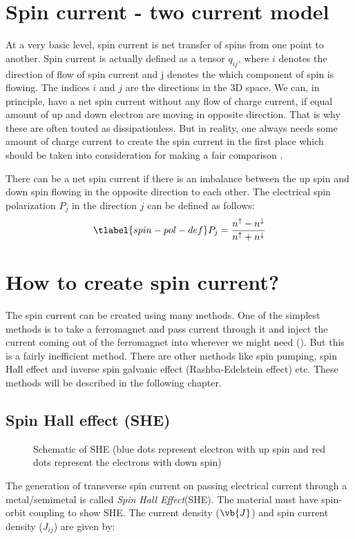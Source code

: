 
\section{Spin current - two current model}
At a very basic level, spin current is net transfer of spins from one point to another. 
Spin current is actually defined as a tensor $q_{ij}$, where $i$ denotes the direction of 
flow of spin current and j denotes the which component of spin is flowing. The indices 
$i$ and $j$ are the directions in the 3D space. We can, in principle, have a net spin current
without any flow of charge current, if equal amount of up and down electron are moving in 
opposite direction. That is why these are often touted as dissipationless. But in reality, 
one always needs some amount of charge current to create the spin current in the first place 
which should be taken into consideration for making a fair comparison \cite{spintronic-sarma}.

There can be a net spin current if there is an imbalance between the up spin and down spin 
flowing in the opposite direction to each other. The electrical spin polarization
$P_j$ in the direction $j$  can be defined as follows:
\begin{equation}
    \centering
    \tlabel{spin-pol-def}
    P_j=\frac{n^{\uparrow}-n^{\downarrow}}{n^{\uparrow}+n^{\downarrow}}
\end{equation}

\section{How to create spin current?}

The spin current can be created using many methods. One of the simplest methods is to take 
a ferromagnet and pass current through it and inject the current coming out of the 
ferromagnet into wherever we might need (). But this is a fairly inefficient method. 
There are other methods like spin pumping, spin Hall effect and inverse spin galvanic 
effect (Rashba-Edelstein effect) etc. These methods will be described in the following chapter.

\subsection{Spin Hall effect (SHE)}

\begin{figure}
    \caption{Schematic of SHE (blue dots represent electron with up spin and
    red dots represent the electrons with down spin)}
\end{figure}
The generation of transverse spin current on passing electrical current through a metal/semimetal is called
\textit{Spin Hall Effect}(SHE). The material must have spin-orbit coupling to show SHE. The current 
density ($\vb{J}$) and spin current density ($J_{ij}$) are given by:

